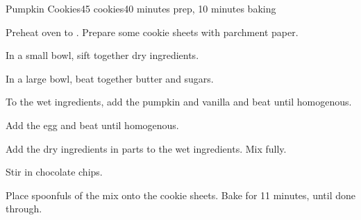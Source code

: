 \documentclass[../Cookbook.tex]{subfiles}
\begin{document}
\begin{recipe}{Pumpkin Cookies}{45 cookies}{40 minutes prep, 10 minutes baking}

Preheat oven to . Prepare some cookie sheets with parchment paper.

In a small bowl, sift together dry ingredients.

In a large bowl, beat together butter and sugars.

To the wet ingredients, add the pumpkin and vanilla and beat until homogenous.

Add the egg and beat until homogenous.

\newstep
Add the dry ingredients in parts to the wet ingredients. Mix fully.

Stir in chocolate chips.

\newstep
Place spoonfuls of the mix onto the cookie sheets. Bake for 11 minutes, until done through.


\end{recipe}
\end{document}
